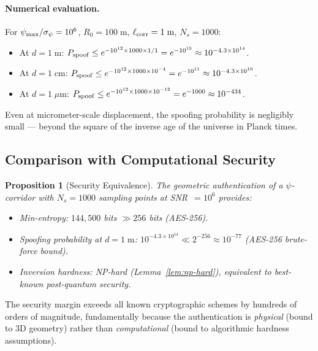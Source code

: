 \documentclass[twocolumn,superscriptaddress,prd,nofootinbib]{revtex4-2}
\newtheorem{proposition}[theorem]{Proposition}
\begin{document}
\paragraph{Numerical evaluation.}
For $\psi_{\rm max}/\sigma_\psi = 10^6$, $R_0 = 100\;\text{m}$,
$\ell_{\rm corr} = 1\;\text{m}$, $N_s = 1000$:
\begin{itemize}
\item At $d = 1\;\text{m}$:
$P_{\rm spoof} \leq e^{-10^{12}\times 1000\times 1/1} = e^{-10^{15}}
\approx 10^{-4.3\times 10^{14}}$.
\item At $d = 1\;\text{cm}$:
$P_{\rm spoof} \leq e^{-10^{12}\times 1000\times 10^{-4}}
= e^{-10^{11}} \approx 10^{-4.3\times 10^{10}}$.
\item At $d = 1\;\mu\text{m}$:
$P_{\rm spoof} \leq e^{-10^{12}\times 1000\times 10^{-12}}
= e^{-1000} \approx 10^{-434}$.
\end{itemize}
Even at micrometer-scale displacement, the spoofing probability is
negligibly small --- beyond the square of the inverse age of the universe
in Planck times.

\subsection{Comparison with Computational Security}

\begin{proposition}[Security Equivalence]\label{prop:security-equiv}
The geometric authentication of a $\psi$-corridor with $N_s = 1000$
sampling points at SNR~$= 10^6$ provides:
\begin{itemize}
\item Min-entropy: $144{,}500$ bits $\gg 256$ bits (AES-256).
\item Spoofing probability at $d = 1\;\text{m}$:
$10^{-4.3\times 10^{14}} \ll 2^{-256} \approx 10^{-77}$ (AES-256
brute-force bound).
\item Inversion hardness: NP-hard (Lemma~\ref{lem:np-hard}),
equivalent to best-known post-quantum security.
\end{itemize}
\end{proposition}

The security margin exceeds all known cryptographic schemes by hundreds
of orders of magnitude, fundamentally because the authentication is
\emph{physical} (bound to 3D geometry) rather than \emph{computational}
(bound to algorithmic hardness assumptions).

\end{document}
